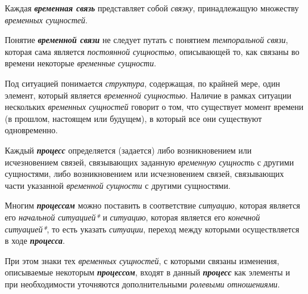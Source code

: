 Каждая \textbf{\textit{временная связь}} представляет собой \textit{связку}, принадлежащую множеству \textit{временных сущностей}.
			
Понятие \textbf{\textit{временной связи}} не следует путать с понятием \textit{темпоральной связи}, которая сама является \textit{постоянной сущностью}, описывающей то, как связаны во времени некоторые \textit{временные сущности}.

\begin{SCn}
\end{SCn}

Под ситуацией понимается \textit{структура}, содержащая, по крайней мере, один элемент, который является \textit{временной сущностью}. Наличие в рамках ситуации нескольких \textit{временных сущностей} говорит о том, что существует момент времени (в прошлом, настоящем или будущем), в который все они существуют одновременно.

\begin{SCn}
\end{SCn}

Каждый \textbf{\textit{процесс}} определяется (задается) либо возникновением или исчезновением связей, связывающих заданную \textit{временную сущность} с другими сущностями, либо возникновением или исчезновением связей, связывающих части указанной \textit{временной сущности} с другими сущностями. 
			
Многим \textbf{\textit{процессам}} можно поставить в соответствие \textit{ситуацию}, которая является его \textit{начальной ситуацией*} и \textit{ситуацию}, которая является его \textit{конечной ситуацией*}, то есть указать \textit{ситуации}, переход между которыми осуществляется в ходе \textbf{\textit{процесса}}.
			
При этом знаки тех \textit{временных сущностей}, с которыми связаны изменения, описываемые некоторым \textbf{\textit{процессом}}, входят в данный \textbf{\textit{процесс}} как элементы и при необходимости уточняются дополнительными \textit{ролевыми отношениями}.

